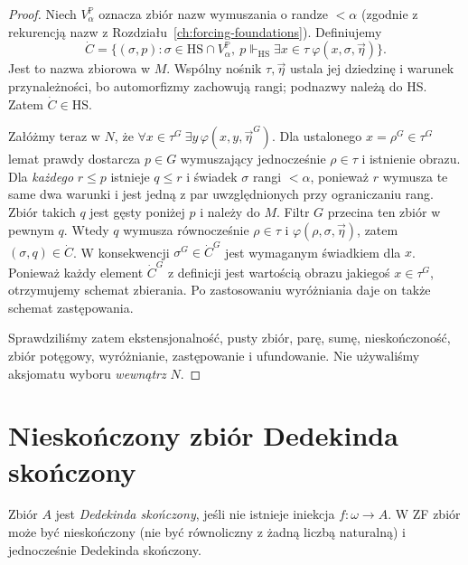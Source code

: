 \begin{proof}
Niech $V_\alpha^{\mathbb P}$ oznacza
zbiór nazw wymuszania o randze $<\alpha$
(zgodnie z rekurencją nazw
z Rozdziału~\ref{ch:forcing-foundations}).
Definiujemy
\[
 \dot C=
 \{(\sigma,p):
   \sigma\in \mathrm{HS}\cap V_\alpha^{\mathbb P},\
   p\Vdash_{\mathrm{HS}}
      \exists x\in\tau\
        \varphi(x,\sigma,\vec\eta)\}.
\]
Jest to nazwa zbiorowa w $M$.
Wspólny nośnik $\tau,\vec\eta$ ustala
jej dziedzinę i warunek przynależności,
bo automorfizmy zachowują rangi;
podnazwy należą do HS.
Zatem $\dot C\in\mathrm{HS}$.

Załóżmy teraz w $N$, że
$\forall x\in\tau^G\ \exists y\,\varphi(x,y,\vec\eta^G)$.
Dla ustalonego $x=\rho^G\in\tau^G$
lemat prawdy dostarcza $p\in G$
wymuszający jednocześnie
$\rho\in\tau$ i istnienie obrazu.
Dla \emph{każdego} $r\le p$
istnieje $q\le r$ i świadek
$\sigma$ rangi $<\alpha$, ponieważ
$r$ wymusza te same dwa warunki
i jest jedną z par uwzględnionych
przy ograniczaniu rang.
Zbiór takich $q$ jest gęsty poniżej $p$
i należy do $M$. Filtr $G$ przecina
ten zbiór w pewnym $q$.
Wtedy $q$ wymusza równocześnie
$\rho\in\tau$ i $\varphi(\rho,\sigma,\vec\eta)$,
zatem $(\sigma,q)\in\dot C$.
W konsekwencji $\sigma^G\in\dot C^G$
jest wymaganym świadkiem dla $x$.
Ponieważ każdy element $\dot C^G$
z definicji jest wartością obrazu
jakiegoś $x\in\tau^G$, otrzymujemy
schemat zbierania. Po zastosowaniu
wyróżniania daje on także
schemat zastępowania.

Sprawdziliśmy zatem ekstensjonalność,
pusty zbiór, parę, sumę, nieskończoność,
zbiór potęgowy, wyróżnianie,
zastępowanie i ufundowanie.
Nie używaliśmy aksjomatu wyboru
\emph{wewnątrz} $N$.
\end{proof}

\section{Nieskończony zbiór Dedekinda skończony}

\begin{definicja}
\label{def:sym36-dedekind}
Zbiór $A$ jest \emph{Dedekinda skończony},
jeśli nie istnieje iniekcja $f:\omega\to A$.
W ZF zbiór może być nieskończony
(nie być równoliczny z żadną liczbą naturalną)
i jednocześnie Dedekinda skończony.
\end{definicja}

